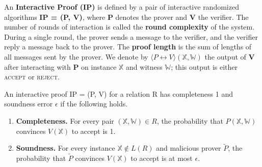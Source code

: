 \begin{definition}
An \textbf{Interactive Proof (IP)} is defined by a pair of interactive randomized
algorithms \textbf{IP = (P, V)}, where \textbf{P} denotes the prover and \textbf{V} the verifier. 
The number of rounds of interaction is called the \textbf{round complexity} of the system. 
During a single round, the prover sends a message to the verifier, and the verifier reply a message back to the prover. 
The \textbf{proof length} is the sum of lengths of all messages sent by the prover.
We denote by $\langle P \leftrightarrow V \rangle (\mathbb{X}, \mathbb{W})$ the output of \textbf{V} after interacting with \textbf{P} on instance $\mathbb{X}$ and witness $\mathbb{W}$; this output is either \textsc{accept} or \textsc{reject}.

An interactive proof IP = (P, V) for a relation R has completeness 1 and soundness error $\epsilon$ if the following holds.

\begin{enumerate}
    \item \textbf{Completeness.}
    For every pair $(\mathbb{X}, \mathbb{W}) \in R$, the probability that $P(\mathbb{X}, \mathbb{W})$ convinces $V(\mathbb{X})$ to accept is 1.
    
    \item \textbf{Soundness.}
    For every instance $\mathbb{X} \not\in L(R)$ and malicious prover $\tilde{P}$, the probability that $\tilde{P}$ convinces $V(\mathbb{X})$ to accept is at most $\epsilon$.
\end{enumerate}
\end{definition}

